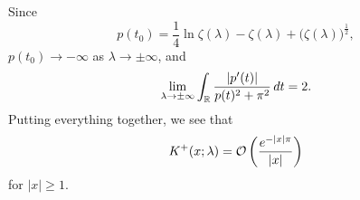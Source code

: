 \documentclass[../dissertation.tex]{subfiles}
\begin{document}
Since
\[
	p(t_0) 
		= \frac{1}{4} \ln\zeta(\lambda) - \zeta(\lambda) 
			+ \big(\zeta(\lambda) \big)^{\frac{1}{2}},
\]
$p(t_0) \to - \infty$ as $\lambda \to \pm \infty$, and 
\[
	\lim_{\lambda\to\pm\infty} \int_{\mathbb{R}} \frac{|p'(t)|}{p(t)^2 + \pi^2}\,dt = 2.
\]
Putting everything together, we see that
\begin{align}\label{eq1:Kasymp}
	K^+(x; \lambda) = \mathcal O\left( \frac{e^{-|x| \pi}}{|x|} \right)
\end{align}
for $|x| \geq 1$.

\end{document}

